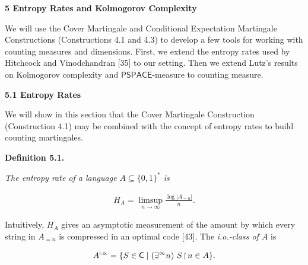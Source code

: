 \par\medskip\noindent\textbf{
5 Entropy Rates and Kolmogorov Complexity}\par




We will use the Cover Martingale and Conditional Expectation Martingale Constructions (Constructions 4.1 and 4.3) to develop a few tools for working with counting measures and dimensions. First, we extend the entropy rates used by Hitchcock and Vinodchandran [35] to our setting. Then we extend Lutz’s results on Kolmogorov complexity and $\mathsf{PSPACE}$-measure to counting measure.\par




\par\medskip\noindent\textbf{
5.1 Entropy Rates}\par




We will show in this section that the Cover Martingale Construction (Construction 4.1) may be combined with the concept of entropy rates to build counting martingales.\par





\par\medskip\noindent\textbf{
\textbf{Definition 5.1}\textbf{.}
}\par



\emph{The entropy
rate of a language $A\subseteq\{0,1\}^{*}$
is}\par


\[\begin{gathered}
H_{A}=\limsup\limits_{n\to\infty}\frac{\log|A_{=n}|}{n}.
\end{gathered}\]






Intuitively, $H_{A}$ gives an asymptotic measurement of the amount by
which every string in $A_{=n}$ is compressed in an optimal code [43].
The \emph{i.o.-class
of $A$} is\par


\[\begin{gathered}
A^{\mathsf{i.o.}}=\{S\in\mathsf{C}\mid(\exists^{\infty}n)\ S\negthinspace\upharpoonright\negthinspace n\in A\}.
\end{gathered}\]


